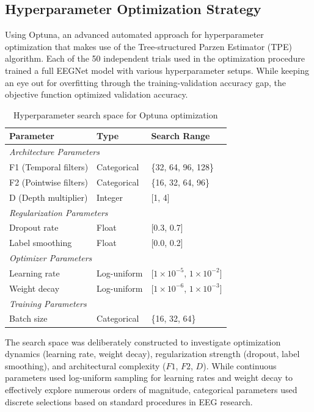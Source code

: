 \subsection{Hyperparameter Optimization Strategy}
Using Optuna, an advanced automated approach for hyperparameter optimization that makes use of the Tree-structured Parzen Estimator (TPE) algorithm.  Each of the 50 independent trials used in the optimization procedure trained a full EEGNet model with various hyperparameter setups.  While keeping an eye out for overfitting through the training-validation accuracy gap, the objective function optimized validation accuracy. 
\begin{table}[htbp]
\centering
\caption{Hyperparameter search space for Optuna optimization}
\label{tab:hyperparams}
\begin{tabular}{lll}
\hline
\textbf{Parameter} & \textbf{Type} & \textbf{Search Range} \\
\hline
\multicolumn{3}{l}{\textit{Architecture Parameters}} \\
F1 (Temporal filters) & Categorical & \{32, 64, 96, 128\} \\
F2 (Pointwise filters) & Categorical & \{16, 32, 64, 96\} \\
D (Depth multiplier) & Integer & [1, 4] \\
\hline
\multicolumn{3}{l}{\textit{Regularization Parameters}} \\
Dropout rate & Float & [0.3, 0.7] \\
Label smoothing & Float & [0.0, 0.2] \\
\hline
\multicolumn{3}{l}{\textit{Optimizer Parameters}} \\
Learning rate & Log-uniform & [$1 \times 10^{-5}$, $1 \times 10^{-2}$] \\
Weight decay & Log-uniform & [$1 \times 10^{-6}$, $1 \times 10^{-3}$] \\
\hline
\multicolumn{3}{l}{\textit{Training Parameters}} \\
Batch size & Categorical & \{16, 32, 64\} \\
\hline
\end{tabular}
\end{table}

The search space was deliberately constructed to investigate optimization dynamics (learning rate, weight decay), regularization strength (dropout, label smoothing), and architectural complexity ($F1$, $F2$, $D$).  While continuous parameters used log-uniform sampling for learning rates and weight decay to effectively explore numerous orders of magnitude, categorical parameters used discrete selections based on standard procedures in EEG research.

